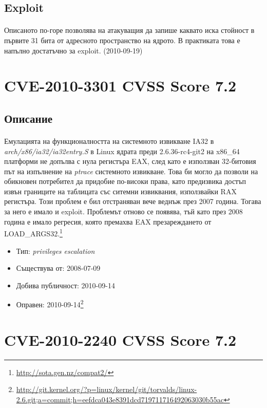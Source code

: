 \documentclass[a4paper,12pt,leqno]{article}
\begin{document}
\subsection{Exploit}
\paragraph{}
Описаното по-горе позволява на атакуващия да запише каквато иска стойност в първите 31 бита от адресното пространство на ядрото. В практиката това е напълно достатъчно за exploit. (2010-09-19)

\section{CVE-2010-3301 CVSS Score 7.2}
\subsection{Описание}
\paragraph{}
Емулацията на функционалността на системното извикване IA32 в\\ \textit{arch/x86/ia32/ia32entry.S} в Linux ядрата преди 2.6.36-rc4-git2 на x86\_64 платформи не допълва с нула регистъра EAX, след като е използван 32-битовия път на изпълнение на \textit{ptrace} системното извикване. Това би могло да позволи на обикновен потребител да придобие по-високи права, като предизвика достъп извън границите на таблицата със ситемни извиквания, използвайки RAX регистъра. Този проблем е бил отстраняван вече веднъж през 2007 година. Тогава за него е имало и exploit. Проблемът отново се появява, тъй като през 2008 година е имало регресия, която премахва EAX презареждането от LOAD\_ARGS32.\footnote{\url{http://sota.gen.nz/compat2/}}

\begin{itemize}
    \item Тип: \textit{privileges escalation}
    \item Съществува от: 2008-07-09
  	\item Добива публичност: 2010-09-14
    \item Оправен: 2010-09-14\footnote{\url{http://git.kernel.org/?p=linux/kernel/git/torvalds/linux-2.6.git;a=commit;h=eefdca043e8391dcd719711716492063030b55ac}}
\end{itemize}

\section{CVE-2010-2240 CVSS Score 7.2}
\end{document}
